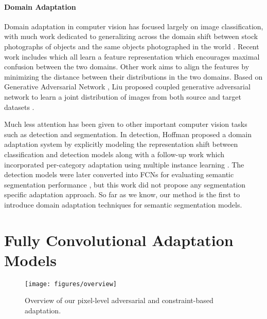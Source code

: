 \documentclass[10pt,twocolumn,letterpaper]{article}
\begin{document}
\paragraph{Domain Adaptation}  
Domain adaptation in computer vision has focused largely on image classification, with much work dedicated to generalizing across the domain shift between stock photographs of objects and the same objects photographed in the world \cite{saenko2010adapting,kulis2011you,gong2012geodesic}. 
Recent work includes \cite{tzeng2015simultaneous,ganin2015unsupervised,ganin2016domain} which all learn a feature representation which encourages maximal confusion between the two domains. 
Other work aims to align the features \cite{long2015learning,long2016unsupervised} by minimizing the distance between their distributions in the two domains. 
Based on Generative Adversarial Network \cite{goodfellow2014generative}, Liu \etal proposed coupled generative adversarial network to learn a joint distribution of images from both source and target datasets \cite{liu2016coupled}.

Much less attention has been given to other important computer vision tasks such as detection and segmentation. 
In detection, Hoffman \etal proposed a domain adaptation system by explicitly modeling the representation shift between classification and detection models \cite{hoffman2014lsda} along with a follow-up work which incorporated per-category adaptation using multiple instance learning \cite{hoffman2015detector}. 
The detection models were later converted into FCNs for evaluating semantic segmentation performance \cite{hoffman2016large}, but this work did not propose any segmentation specific adaptation approach. 
So far as we know, our method is the first to introduce domain adaptation techniques for semantic segmentation models.


 \newcommand{\src}{\mathcal{S}}
\newcommand{\tgt}{\mathcal{T}}
\newcommand{\img}{{I}}
\newcommand{\anno}{L}
\newcommand{\net}{\phi}
\newcommand{\srcNet}{\phi_{\src}}
\newcommand{\tgtNet}{\phi_{\tgt}}
\newcommand{\srcImg}{\img_{\src}}
\newcommand{\srcLabel}{\anno_{\src}}
\newcommand{\tgtImg}{\img_{\tgt}}
\newcommand{\tgtLabel}{\anno_{\tgt}}

\newcommand{\loss}{\mathcal{L}}
\newcommand{\daLoss}{\loss_{da}}
\newcommand{\segLoss}{\loss_{seg}}
\newcommand{\miLoss}{\loss_{mi}}
\newcommand{\srcLabelStat}{\mathcal{P}_{\srcLabel}}

\section{Fully Convolutional Adaptation Models}
\begin{figure}[t]
	\begin{center}
		\texttt{[image: figures/overview]}
	\end{center}
    \vspace{-3mm}
	\caption{Overview of our pixel-level adversarial and constraint-based adaptation.}
	\vspace{-3mm}
    \label{fig:framework}
\end{figure}
\end{document}
